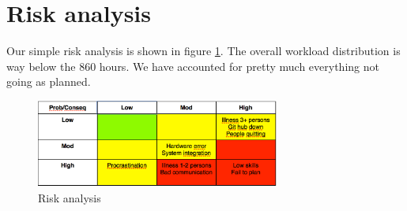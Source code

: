 \documentclass[a4paper, english, 12pt]{article}
\begin{document}
\section{Risk analysis}
Our simple risk analysis is shown in figure \ref{risk}. The overall workload distribution is way below the $860$ hours. We have accounted for pretty much everything not going as planned. 
\begin{figure}[h!] %
    \begin{center} %
    	\includegraphics[width=8cm]{Risikoanalyse.png}
		\caption{Risk analysis}
	\label{risk}
	\end{center}
\end{figure}
\end{document}
